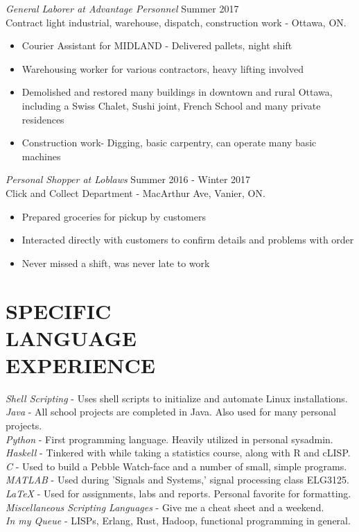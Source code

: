 \documentclass[margin]{res}
\begin{document}
\begin{resume}
 {\sl General Laborer at Advantage Personnel} \hfill    Summer 2017 \\
                Contract light industrial, warehouse, dispatch, construction work - Ottawa, ON.
                 \begin{itemize}  \itemsep -2pt %
                 \item Courier Assistant for MIDLAND - Delivered pallets, night shift
                 \item Warehousing worker for various contractors, heavy lifting involved
                 \item Demolished and restored many buildings in downtown and rural Ottawa, including a Swiss Chalet, Sushi joint, French School and many private residences
\item Construction work- Digging, basic carpentry, can operate many basic machines
                 \end{itemize} 
 
 
                {\sl Personal Shopper at Loblaws} \hfill            Summer 2016 - Winter 2017 \\
                Click and Collect Department - MacArthur Ave, Vanier, ON.
                 \begin{itemize}  \itemsep -2pt %
                 \item Prepared groceries for pickup by customers
                 \item Interacted directly with customers to confirm details and problems with order
                 \item Never missed a shift, was never late to work
                 \end{itemize} 


\section{SPECIFIC \\ LANGUAGE \\ EXPERIENCE} 
{\sl Shell Scripting} - Uses shell scripts to initialize and automate Linux installations.\\       
{\sl Java} - All school projects are completed in Java. Also used for many personal projects.\\
{\sl Python} - First programming language. Heavily utilized in personal sysadmin.\\
{\sl Haskell} -  Tinkered with while taking a statistics course, along with R and cLISP.\\
{\sl C} - Used to build a Pebble Watch-face and a number of small, simple programs.\\
{\sl MATLAB} - Used during 'Signals and Systems,' signal processing class ELG3125.\\
{\sl LaTeX} -  Used for assignments, labs and reports. Personal favorite for formatting.\\
{\sl Miscellaneous Scripting Languages} -  Give me a cheat sheet and a weekend.\\
{\sl In my Queue} - LISPs, Erlang, Rust, Hadoop, functional programming in general.





\end{resume}
\end{document}
